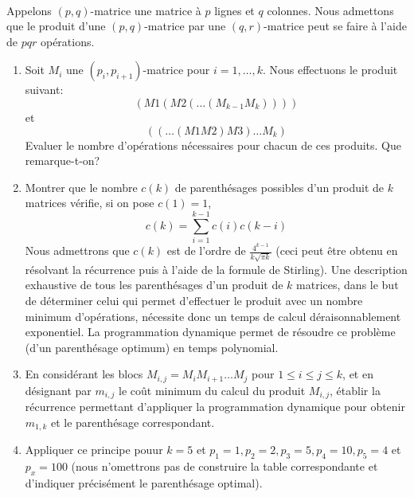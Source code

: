 \begin{td-exo}\,\\ %
	Appelons \((p,q)\)-matrice une matrice à \(p\) lignes et \(q\) colonnes.
	Nous admettons que le produit d'une \((p,q)\)-matrice par une \((q,r)\)-matrice peut se faire à l'aide de \(pqr\) opérations.

	\begin{enumerate}
		\item Soit \(M_i\) une \((p_i, p_{i+1})\)-matrice pour \(i = 1, \ldots, k\).
		Nous effectuons le produit suivant:
		\begin{equation*}
			\left(
				M1 \left(
					M2 \left(
						\ldots \left(
							M_{k-1} M_k
						\right)
					\right)
				\right)
			\right)
		\end{equation*}
		et
		\begin{equation*}
			\left(
				\left(
					\ldots \left(
						M1 M2
					\right) M3
				\right) \ldots M_k
			\right)
		\end{equation*}
		Evaluer le nombre d'opérations nécessaires pour chacun de ces produits.
		Que remarque-t-on?

		\item Montrer que le nombre \(c(k)\) de parenthésages possibles d'un produit de \(k\) matrices vérifie, si on pose \(c(1) = 1\), 
		\begin{equation*}
			c(k) = \sum_{i=1}^{k-1} c(i) c(k - i)
		\end{equation*}
		Nous admettrons que \(c(k)\) est de l'ordre de \(\frac{4^{k - 1}}{k \sqrt{\pi k}}\) (ceci peut être obtenu en résolvant la récurrence puis à l'aide de la formule de Stirling).
		Une description exhaustive de tous les parenthésages d'un produit de \(k\) matrices, dans le but de déterminer celui qui permet d'effectuer le produit avec un nombre minimum d'opérations, nécessite donc un temps de calcul déraisonnablement exponentiel.
		La programmation dynamique permet de résoudre ce problème (d'un parenthésage optimum) en temps polynomial.

		\item En considérant les blocs \(M_{i, j} = M_i M_{i + 1} \ldots M_j\) pour \(1 \leq i \leq j \leq k\), et en désignant par \(m_{i, j}\) le coût minimum du calcul du produit \(M_{i, j}\), établir la récurrence permettant d'appliquer la programmation dynamique pour obtenir \(m_{1, k}\) et le parenthésage correspondant.

		\item Appliquer ce principe pouur \(k = 5\) et \(p_1 = 1, p_2 = 2, p_3 = 5, p_4 = 10, p_5 = 4\) et \(p_x = 100\) (nous n'omettrons pas de construire la table correspondante et d'indiquer précisément le parenthésage optimal).
	\end{enumerate}
\end{td-exo}

